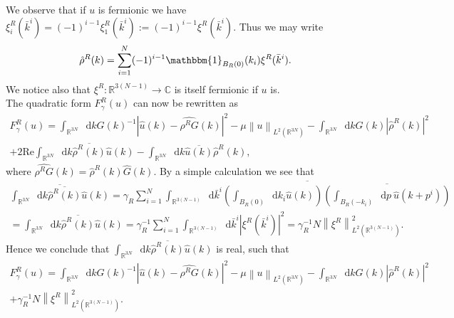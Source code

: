 \documentclass[a4paper,11pt]{article}
\newcommand{\Real}{\text{Re}}
\newcommand{\norm}[1]{\left\lVert #1 \right\rVert}
\newcommand{\abs}[1]{\left\lvert #1 \right\rvert}
\newcommand*\diff{\mathop{}\!\mathrm{d}}
\newcommand{\R}{\mathbb{R}}
\newcommand{\C}{\mathbb{C}}
\numberwithin{equation}{section}
\begin{document}
We observe that if $ u $ is fermionic we have $ \xi_i^R(\bar{k}^i)=(-1)^{i-1}\xi_1^R(\bar{k}^i):=(-1)^{i-1}\xi^R(\bar{k}^i) $. Thus we may write \begin{equation}
\hat{\rho}^R(k)=\sum_{i=1}^{N}(-1)^{i-1}\mathbbm{1}_{B_R(0)}(k_i)\xi^R(\bar{k}^i).
\end{equation} 
We notice also that $ \xi^R:\R^{3(N-1)}\to\C $ is itself fermionic if $ u $ is.\\
The quadratic form $ F_\gamma^R(u) $ can now be rewritten as \begin{equation}
\begin{aligned}
F_\gamma^R(u)=\int_{\R^{3N}}\diff k \hat{G}(k)^{-1}|\hat{u}(k)-\widehat{\rho^R G}(k)|^2-\mu\norm{u}_{L^2(\R^{3N})}-\int_{\R^{3N}}\diff k\hat{G}(k)\abs{\hat{\rho}^R(k)}^2\\+2\Real\int_{\R^{3N}}\diff k \overline{\hat{\rho}^R(k)}\hat{u}(k)-\int_{\R^{3N}}\diff k \overline{\hat{u}(k)}\hat{\rho}^R(k),
\end{aligned}
\end{equation}
where $ \widehat{\rho^RG}(k)=\hat{\rho}^R(k)\hat{G}(k) $.
By a simple calculation we see that \begin{equation}
\begin{aligned}
\overline{\int_{\R^{3N}}\diff k \overline{\hat{\rho}^R(k)}\hat{u}(k)}=\gamma_R\sum_{i=1}^{N}\overline{\int_{\R^{3(N-1)}}\diff \bar{k}^i\left(\int_{B_R(0)}\diff k_i\hat{u}(k)\right)\overline{\left(\int_{B_R(-k_i)}\diff p\ \hat{u}(k+p^i)\right)}}\\
=\int_{\R^{3N}}\diff k \overline{\hat{\rho}^R(k)}\hat{u}(k)=\gamma_R^{-1}\sum_{i=1}^{N}\int_{\R^{3(N-1)}}\diff \bar{k}^i\abs{\xi^R(\bar{k}^i)}^2=\gamma_R^{-1}N\norm{\xi^R}_{L^2(\R^{3(N-1)})}^2.
\end{aligned}
\end{equation}
Hence we conclude that $ \int_{\R^{3N}}\diff k \overline{\hat{\rho}^R(k)}\hat{u}(k) $ is real, such that 
\begin{equation}\label{QuadraticForm2}
\begin{aligned}
F_\gamma^R(u)=\int_{\R^{3N}}\diff k \hat{G}(k)^{-1}|\hat{u}(k)-\widehat{\rho^R G}(k)|^2-\mu\norm{u}_{L^2(\R^{3N})}-\int_{\R^{3N}}\diff k\hat{G}(k)\abs{\hat{\rho}^R(k)}^2\\+\gamma_R^{-1}N\norm{\xi^R}_{L^2(\R^{3(N-1)})}^2.\quad
\end{aligned}
\end{equation}
\end{document}
